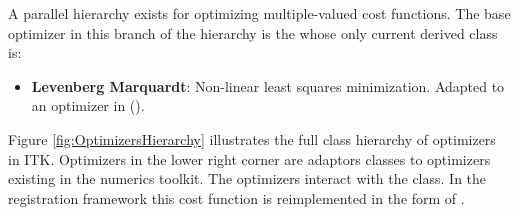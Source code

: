 A parallel hierarchy exists for optimizing multiple-valued cost functions. The
base optimizer in this branch of the hierarchy is the
 whose only current derived class
is:

\begin{itemize}

\item \textbf{Levenberg Marquardt}: Non-linear least squares minimization.
Adapted to an optimizer in  ().

\end{itemize}


Figure \ref{fig:OptimizersHierarchy} illustrates the full class hierarchy of
optimizers in ITK. Optimizers in the lower right corner are adaptors classes
to optimizers existing in the  numerics toolkit. The optimizers
interact with the  class. In the registration framework
this cost function is reimplemented in the form of
.





